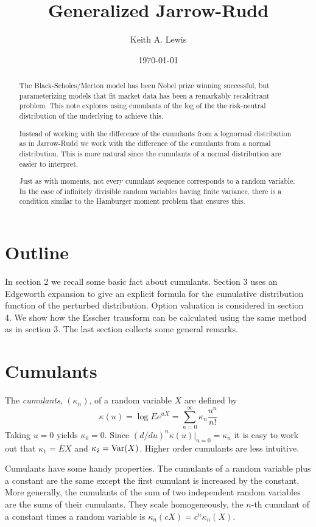 \documentclass[11pt]{article}
\title{Generalized Jarrow-Rudd}
\author{Keith A. Lewis}
\date{\today}
\newcommand{\Var}{\mathop{\rm{Var}}}
\theoremstyle{remark}
\begin{document}
\maketitle
\begin{abstract}
The Black-Scholes/Merton model has been Nobel prize winning successful,
but parameterizing models that fit market data has been a remarkably
recalcitrant problem. This note explores using cumulants of the
log of the the risk-neutral distribution of the underlying to
achieve this.

Instead of working with the difference of the cumulants from a lognormal
distribution as in Jarrow-Rudd \cite{JarRud1982} we work with the difference of
the cumulants from a normal distribution. 
This is more natural since the cumulants of a normal distribution are
easier to interpret.

Just as with moments, not every cumulant sequence corresponds to a
random variable. In the case of infinitely divisible random variables
having finite variance, there is a condition similar to the Hamburger
moment problem that ensures this.
\end{abstract}

\section{Outline}
In section 2 we recall some basic fact about cumulants.
Section 3 uses an Edgeworth expansion to give an explicit formula for
the cumulative distribution function of the perturbed distribution.
Option valuation is considered in section 4. We show how the
Esscher transform can be calculated using the same method as in
section 3. The last section collects some
general remarks.

\section{Cumulants}

The {\em cumulants}, \((\kappa_n)\), of a random variable \(X\)
are defined by
\[
\kappa(u) = \log Ee^{uX} = \sum_{n=0}^\infty \kappa_n \frac{u^n}{n!}
\]
Taking \(u = 0\) yields \(\kappa_0 = 0\). Since
\((d/du)^n\kappa(u)|_{u = 0} = \kappa_n\) it is easy to
work out that
\(\kappa_1 = EX\) and \(\kappa_2 = \Var(X)\). Higher order
cumulants are less intuitive.

Cumulants have some handy properties. 
The cumulants of a random variable plus a constant are the 
same except the first cumulant is increased by the constant.
More generally, the cumulants of the sum of two independent 
random variables are the sums of their cumulants.
They scale homogeneously, the \(n\)-th cumulant of a constant
times a random variable is
\(\kappa_n(cX) = c^n\kappa_n(X)\).
\end{document}
